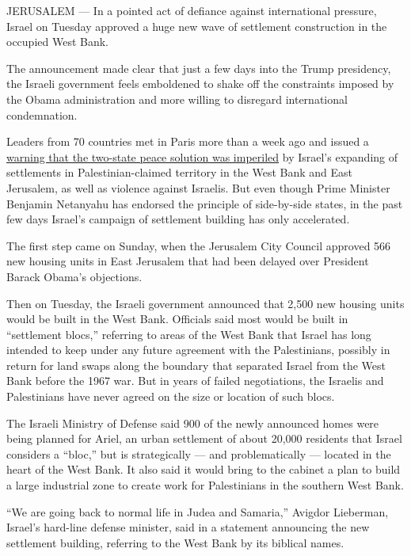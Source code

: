 JERUSALEM --- In a pointed act of defiance against international
pressure, Israel on Tuesday approved a huge new wave of settlement
construction in the occupied West Bank.

The announcement made clear that just a few days into the Trump
presidency, the Israeli government feels emboldened to shake off the
constraints imposed by the Obama administration and more willing to
disregard international condemnation.

Leaders from 70 countries met in Paris more than a week ago and issued a
\href{https://www.nytimes.com/2017/01/15/world/middleeast/missing-at-israel-palestinian-peace-conference-israelis-or-palestinians.html}{warning
that the two-state peace solution was imperiled} by Israel's expanding
of settlements in Palestinian-claimed territory in the West Bank and
East Jerusalem, as well as violence against Israelis. But even though
Prime Minister Benjamin Netanyahu has endorsed the principle of
side-by-side states, in the past few days Israel's campaign of
settlement building has only accelerated.

The first step came on Sunday, when the Jerusalem City Council approved
566 new housing units in East Jerusalem that had been delayed over
President Barack Obama's objections.

Then on Tuesday, the Israeli government announced that 2,500 new housing
units would be built in the West Bank. Officials said most would be
built in ``settlement blocs,'' referring to areas of the West Bank that
Israel has long intended to keep under any future agreement with the
Palestinians, possibly in return for land swaps along the boundary that
separated Israel from the West Bank before the 1967 war. But in years of
failed negotiations, the Israelis and Palestinians have never agreed on
the size or location of such blocs.

The Israeli Ministry of Defense said 900 of the newly announced homes
were being planned for Ariel, an urban settlement of about 20,000
residents that Israel considers a ``bloc,'' but is strategically --- and
problematically --- located in the heart of the West Bank. It also said
it would bring to the cabinet a plan to build a large industrial zone to
create work for Palestinians in the southern West Bank.

``We are going back to normal life in Judea and Samaria,'' Avigdor
Lieberman, Israel's hard-line defense minister, said in a statement
announcing the new settlement building, referring to the West Bank by
its biblical names.

